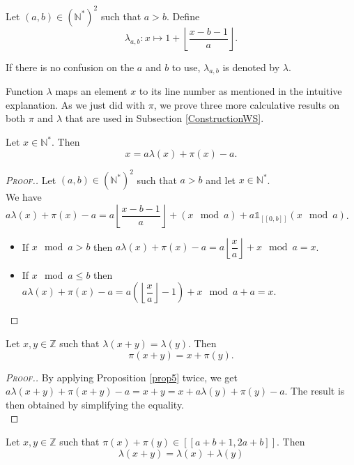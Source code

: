 \begin{definition}
Let \((a,b) \in (\mathbb{N}^*)^2\) such that \(a>b\). Define
\[ \lambda_{a,b}:x \longmapsto 1+ \left\lfloor\dfrac{x-b-1}{a}\right\rfloor.\]
\end{definition}

If there is no confusion on the \(a\) and \(b\) to use, \(\lambda_{a, b}\) is denoted by \(\lambda\).

Function \(\lambda\) maps an element \(x\) to its line number as mentioned in the intuitive explanation.
As we just did with \(\pi\), we prove three more calculative results on both \(\pi\) and \(\lambda\) that are used in
Subsection \ref{ConstructionWS}.

\begin{proposition}
\label{prop5}
Let \(x\in \mathbb{N}^*\). Then
\[
x=a\lambda(x)+\pi(x)-a.
\]
\end{proposition}

\begin{proof}[\textsc{Proof.}]
Let \((a,b)\in (\mathbb{N}^*)^2\) such that \(a>b\) and let \(x\in \mathbb{N}^*\). \\
We have \(a\lambda(x)+\pi(x)-a=a\left\lfloor\dfrac{x-b-1}{a}\right\rfloor+(x \mod a)+ a \mathds{1}_{ [\![0,b]\!]}(x \mod a)\).

\begin{itemize}
\item If \(x \mod a>b\) then \(a\lambda(x)+\pi(x)-a=a\left\lfloor\dfrac{x}{a}\right\rfloor+x \mod a=x\).
\item If \(x \mod a \leqslant b\) then \(a\lambda(x)+\pi(x)-a=a \left( \left \lfloor \dfrac{x}{a} \right \rfloor - 1 \right)+x \mod a +a=x\).
\end{itemize}
\end{proof}

\begin{proposition}
\label{prop6}
Let \(x, y \in \mathbb{Z}\) such that \(\lambda(x + y) = \lambda(y)\). Then
\[
\pi(x + y) = x + \pi(y).
\]
\end{proposition}

\begin{proof}[\textsc{Proof.}]
By applying Proposition \ref{prop5} twice, we get \(a \lambda(x + y) + \pi(x + y) - a = x + y = x + a \lambda(y) + \pi(y) - a\).
The result is then obtained by simplifying the equality. \\
\end{proof}

\begin{proposition}
\label{prop7}
Let \(x, y \in \mathbb{Z}\) such that \(\pi(x) + \pi(y) \in [\![a + b + 1, 2 a + b]\!]\). Then
\[
\lambda(x + y) = \lambda(x) + \lambda(y)
\]
\end{proposition}

